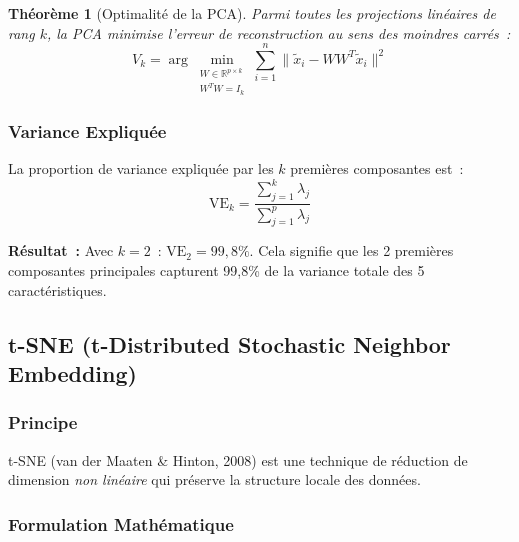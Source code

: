 \documentclass[12pt,a4paper]{article}
\newtheorem{theoreme}{Théorème}[section]
\begin{document}
\begin{theoreme}[Optimalité de la PCA]
Parmi toutes les projections linéaires de rang $k$, la PCA minimise l'erreur de reconstruction au sens des moindres carrés~:
\[
    V_k = \arg\min_{\substack{W \in \mathbb{R}^{p \times k} \\ W^T W = I_k}} \sum_{i=1}^{n} \|\tilde{x}_i - W W^T \tilde{x}_i\|^2
\]
\end{theoreme}

\subsubsection{Variance Expliquée}

La proportion de variance expliquée par les $k$ premières composantes est~:
\[
    \text{VE}_k = \frac{\sum_{j=1}^{k} \lambda_j}{\sum_{j=1}^{p} \lambda_j}
\]

\textbf{Résultat~:} Avec $k = 2$~: $\text{VE}_2 = 99{,}8\%$. Cela signifie que les 2 premières composantes principales capturent 99,8\% de la variance totale des 5 caractéristiques.

\subsection{t-SNE (t-Distributed Stochastic Neighbor Embedding)}

\subsubsection{Principe}

t-SNE (van der Maaten \& Hinton, 2008) est une technique de réduction de dimension \emph{non linéaire} qui préserve la structure locale des données.

\subsubsection{Formulation Mathématique}
\end{document}
